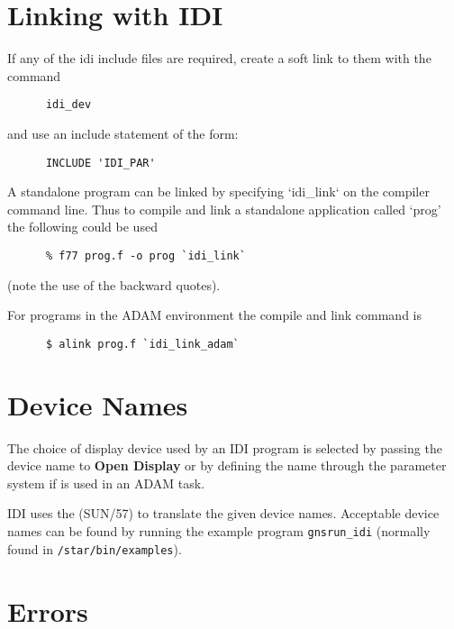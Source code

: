\section{Linking with IDI}
If any of the idi include files are required, create a soft link to them
with the command
\begin{small}
\begin{verbatim}
      idi_dev
\end{verbatim}
\end{small}
and use an include statement of the form:
\begin{small}
\begin{verbatim}
      INCLUDE 'IDI_PAR'
\end{verbatim}
\end{small}

A standalone program can be linked by specifying `idi\_link` on the
compiler command line. Thus to compile and link a standalone application
called `prog' the following could be used
\begin{small}
\begin{verbatim}
      % f77 prog.f -o prog `idi_link`
\end{verbatim}
\end{small}
(note the use of the backward quotes).

For programs in the ADAM environment the compile and link command is
\begin{small}
\begin{verbatim}
      $ alink prog.f `idi_link_adam`
\end{verbatim}
\end{small}

\section{Device Names}

The choice of display device used by an IDI program is selected by
passing the device name to {\bf Open Display} or by defining the name
through the parameter system if
 is used in an ADAM task.

IDI uses the 
(SUN/57) to translate the given
device names. Acceptable device names can be found by running the example
program {\tt gnsrun\_idi} (normally found in {\tt /star/bin/examples}).


\section{Errors}

